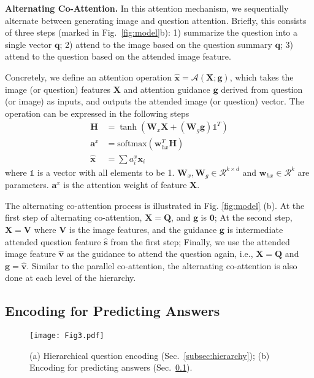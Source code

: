 \documentclass{article}
\begin{document}
\textbf{Alternating Co-Attention.} In this attention mechanism, we sequentially alternate between generating image and question attention. Briefly, this consists of three steps (marked in Fig.~\ref{fig:model}b): 1) summarize the question into a single vector $\bm{q}$; 2) attend to the image based on the question summary $\bm{q}$; 3) attend to the question based on the attended image feature. 

Concretely, we define an attention operation $\hat{\bm{x}} = \mathcal{A}({\bm{X}}; \bm{g})$, which takes the image (or question) features $\bm{X}$ and attention guidance $\bm{g}$ derived from question (or image) as inputs, and outputs the attended image (or question) vector. The operation can be expressed in the following steps
\begin{equation}
\begin{aligned}
\bm{H} &= \tanh(\bm{W}_x \bm{X} + (\bm{W}_{g} \bm{g}) \bm{\mathds{1}}^T) \\ 
\bm{a}^x &= \textrm{softmax}(\bm{w}_{hx}^T \bm{H}) \\
\hat{\bm{x}} &= \sum a^x_i \bm{x}_i
\end{aligned}
\end{equation}
where $\bm{\mathds{1}}$ is a vector with all elements to be 1. $\bm{W}_x, \bm{W}_g \in \mathcal{R}^{k \times d}$ and $\bm{w}_{hx} \in \mathcal{R}^k$ are parameters. $\bm{a}^x$ is the attention weight of feature $\bm{X}$. 

The alternating co-attention process is illustrated in Fig. \ref{fig:model} (b). At the first step of alternating co-attention, $\bm{X} = \bm{Q}$, and $\bm{g}$ is $\bm{0}$; At the second step, $\bm{X} = \bm{V}$ where $\bm{V}$ is the image features, and the guidance $\bm{g}$ is intermediate attended question feature $\hat{\bm{s}}$ from the first step; Finally, we use the attended image feature $\hat{\bm{v}}$ as the guidance to attend the question again, i.e., $\bm{X} = \bm{{Q}}$ and $\bm{g} = \hat{\bm{v}}$. Similar to the parallel co-attention, the alternating co-attention is also done at each level of the hierarchy.
\subsection{Encoding for Predicting Answers}
\label{subsec:recursive}

\begin{figure}[t]
 \centering 
 \texttt{[image: Fig3.pdf]}
 \caption{(a) Hierarchical question encoding (Sec.~\ref{subsec:hierarchy}); (b) Encoding for predicting answers (Sec.~\ref{subsec:recursive}).}
 \label{fig:added}
\end{figure}
\end{document}

